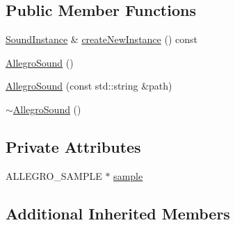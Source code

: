 \subsection*{Public Member Functions}
\begin{DoxyCompactItemize}
\item 
\hyperlink{classZeta_1_1SoundInstance}{Sound\+Instance} \& \hyperlink{classZeta_1_1AllegroSound_a3b483c40403834b6048283ad56774637}{create\+New\+Instance} () const 
\item 
\hyperlink{classZeta_1_1AllegroSound_adbde39881d7c93c88902cc34a26ed6aa}{Allegro\+Sound} ()
\item 
\hyperlink{classZeta_1_1AllegroSound_a535e4f2f64cf096924d58eb4508bf05b}{Allegro\+Sound} (const std\+::string \&path)
\item 
\hyperlink{classZeta_1_1AllegroSound_a329d68ff0379371fb7427d5b1725f3ac}{$\sim$\+Allegro\+Sound} ()
\end{DoxyCompactItemize}
\subsection*{Private Attributes}
\begin{DoxyCompactItemize}
\item 
A\+L\+L\+E\+G\+R\+O\+\_\+\+S\+A\+M\+P\+L\+E $\ast$ \hyperlink{classZeta_1_1AllegroSound_ae95788952c729697ade91a6a9a0d806b}{sample}
\end{DoxyCompactItemize}
\subsection*{Additional Inherited Members}


